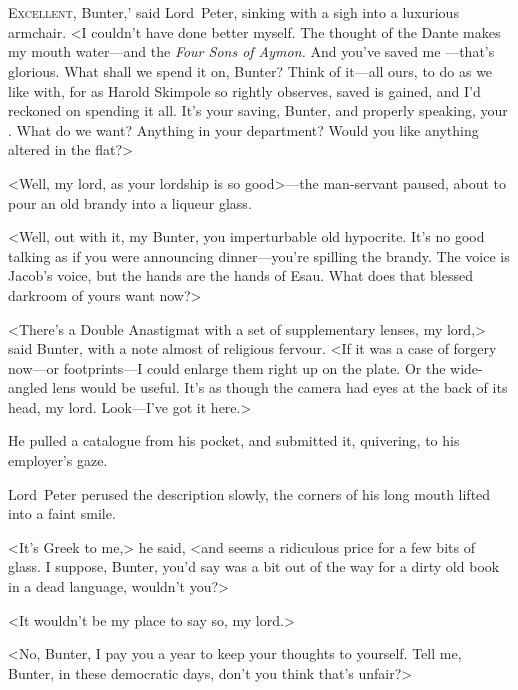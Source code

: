 \chapter[Chapter \thechapter]{}
\lettrine[lines=4,ante=‘]{E}{xcellent}, Bunter,' said Lord~Peter, sinking with a sigh into a luxurious armchair. <I couldn't have done better myself. The thought of the Dante makes my mouth water—and the \textit{Four Sons of Aymon.} And you've saved me —that's glorious. What shall we spend it on, Bunter? Think of it—all ours, to do as we like with, for as Harold Skimpole so rightly observes,  saved is  gained, and I'd reckoned on spending it all. It's your saving, Bunter, and properly speaking, your . What do we want? Anything in your department? Would you like anything altered in the flat?>

<Well, my lord, as your lordship is so good>—the man-servant paused, about to pour an old brandy into a liqueur glass.

<Well, out with it, my Bunter, you imperturbable old hypocrite. It's no good talking as if you were announcing dinner—you're spilling the brandy. The voice is Jacob's voice, but the hands are the hands of Esau. What does that blessed darkroom of yours want now?>

<There's a Double Anastigmat with a set of supplementary lenses, my lord,> said Bunter, with a note almost of religious fervour. <If it was a case of forgery now—or footprints—I could enlarge them right up on the plate. Or the wide-angled lens would be useful. It's as though the camera had eyes at the back of its head, my lord. Look—I've got it here.>

He pulled a catalogue from his pocket, and submitted it, quivering, to his employer's gaze.

Lord~Peter perused the description slowly, the corners of his long mouth lifted into a faint smile.

<It's Greek to me,> he said, <and  seems a ridiculous price for a few bits of glass. I suppose, Bunter, you'd say  was a bit out of the way for a dirty old book in a dead language, wouldn't you?>

<It wouldn't be my place to say so, my lord.>

<No, Bunter, I pay you  a year to keep your thoughts to yourself. Tell me, Bunter, in these democratic days, don't you think that's unfair?>

